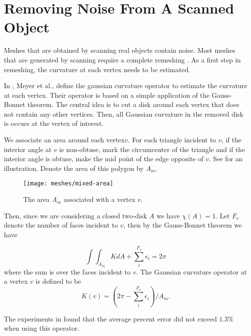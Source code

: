 \section{Removing Noise From A Scanned Object}
\label{sec:removing}



Meshes that are obtained by scanning real objects contain noise.
Most meshes that are generated by scanning require a complete
remeshing \cite{remeshing-2003}.
As a first step in remeshing, the curvature at each
vertex needs to be estimated.

In \cite{mmsb-2003}, Meyer et al., define the gaussian curvature operator
to estimate the curvature at each vertex. Their operator is 
based on a simple application of the Gauss-Bonnet theorem.
The central idea is to cut a disk around each vertex that does not contain
any other vertices. Then, all Gaussian curvature in the removed
disk is occurs at the vertex of interest.

We associate an area around each vertex$v$. 
For each triangle incident to $v$, if the interior 
angle at $v$ is non-obtuse, mark the circumcenter of the triangle
and if the interior angle is obtuse, make the mid point of the edge
opposite of $v$. See  for an illustration.
Denote the area of this polygon by $A_m.$


\begin{figure}[htb]
\centering
\texttt{[image: meshes/mixed-area]}
\caption{The area $A_m$ associated with a vertex $v$.}
\label{fig:mixed-area}
\end{figure}


Then, since we are considering a closed two-disk $A$ we have $\chi(A)=1$.
Let $F_v$ denote the number of faces incident to $v$, 
then by the Gauss-Bonnet theorem we have

$$\int \int_{A_m}K dA +\sum_i^{F_v} \epsilon_i=2\pi$$
where the sum is over the faces incident to $v$.
The Gaussian curvature operator at a vertex $v$ is defined
to be
$$K(v)=\left( 2\pi -\sum_i^{F_v}\epsilon_i\right)/ A_m.$$

The experiments in \cite{mmsb-2003} found that the average
percent error did not exceed $1.3\%$ when using this operator.

